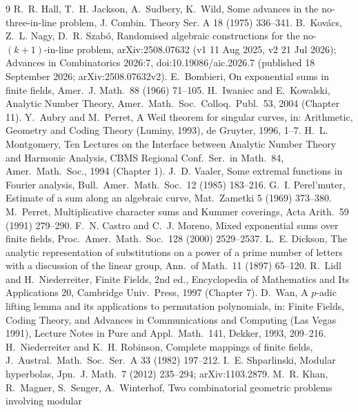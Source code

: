 \documentclass[11pt]{article}
\theoremstyle{remark}
\begin{document}
\begin{thebibliography}{9}
 R.~R. Hall, T.~H. Jackson, A.~Sudbery, K.~Wild, Some advances in the no-three-in-line problem,
 J. Combin. Theory Ser. A 18 (1975) 336--341.
 B.~Kov\'acs, Z.~L. Nagy, D.~R. Szab\'o, Randomised algebraic constructions for the no-$(k+1)$-in-line
 problem, arXiv:2508.07632 (v1 11 Aug 2025, v2 21 Jul 2026); Advances in Combinatorics 2026:7, doi:10.19086/aic.2026.7
 (published 18 September 2026; arXiv:2508.07632v2).
 E.~Bombieri, On exponential sums in finite fields, Amer.\ J. Math.\ 88 (1966) 71--105.
 H.~Iwaniec and E.~Kowalski, Analytic Number Theory, Amer.\ Math.\ Soc.\ Colloq.\ Publ.\ 53, 2004 (Chapter 11).
 Y.~Aubry and M.~Perret, A Weil theorem for singular curves, in: Arithmetic, Geometry and Coding Theory
 (Luminy, 1993), de Gruyter, 1996, 1--7.
 H.~L. Montgomery, Ten Lectures on the Interface between Analytic Number Theory and Harmonic Analysis,
 CBMS Regional Conf.\ Ser.\ in Math.\ 84, Amer.\ Math.\ Soc., 1994 (Chapter 1).
 J.~D. Vaaler, Some extremal functions in Fourier analysis, Bull.\ Amer.\ Math.\ Soc.\ 12 (1985) 183--216.
 G.~I. Perel'muter, Estimate of a sum along an algebraic curve, Mat.\ Zametki 5 (1969) 373--380.
 M.~Perret, Multiplicative character sums and Kummer coverings, Acta Arith.\ 59 (1991) 279--290.
 F.~N. Castro and C.~J. Moreno, Mixed exponential sums over finite fields, Proc.\ Amer.\ Math.\ Soc.\ 128 (2000) 2529--2537.
 L.~E. Dickson, The analytic representation of substitutions on a power of a prime number of letters with a discussion of
 the linear group, Ann.\ of Math.\ 11 (1897) 65--120.
 R.~Lidl and H.~Niederreiter, Finite Fields, 2nd ed., Encyclopedia of Mathematics and Its Applications 20,
 Cambridge Univ.\ Press, 1997 (Chapter 7).
 D.~Wan, A $p$-adic lifting lemma and its applications to permutation polynomials, in: Finite Fields, Coding Theory, and Advances in
 Communications and Computing (Las Vegas 1991), Lecture Notes in Pure and Appl.\ Math.\ 141, Dekker, 1993, 209--216.
 H.~Niederreiter and K.~H. Robinson, Complete mappings of finite fields, J.\ Austral.\ Math.\ Soc.\ Ser.\ A 33 (1982) 197--212.
 I.~E. Shparlinski, Modular hyperbolas, Jpn.\ J. Math.\ 7 (2012) 235--294; arXiv:1103.2879.
 M.~R. Khan, R.~Magner, S.~Senger, A.~Winterhof, Two combinatorial geometric problems involving modular

\end{thebibliography}
\end{document}

